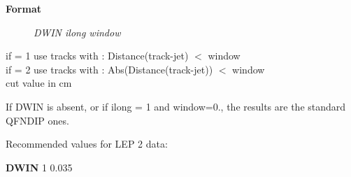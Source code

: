 \begin{description}\item[\bf{Format}]
{\it DWIN ilong  window}
\end{description}
\begin{indentlist}{ 3.75cm}{ 4.00cm}
if = 1 use tracks with : Distance(track-jet) $<$ window\\
if = 2 use tracks with : Abs(Distance(track-jet)) $<$ window\\
cut value in cm
\end{indentlist}

If DWIN is absent, or if ilong = 1 and window=0., the results are the standard QFNDIP ones.

Recommended values for LEP 2 data:

{\bf DWIN}  1  0.035


